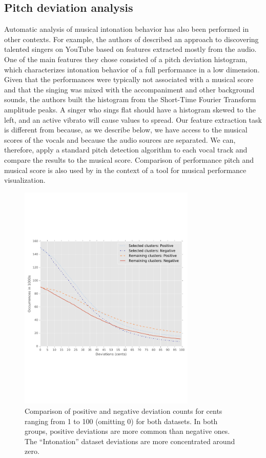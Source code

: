 \begin{appendices}
\subsection{Pitch deviation analysis}
Automatic analysis of musical intonation behavior has also been performed in other contexts. For example, the authors of \cite{nichols2012automatically} described an approach to discovering talented singers on YouTube based on features extracted mostly from the audio. One of the main features they chose consisted of a pitch deviation histogram, which characterizes intonation behavior of a full performance in a low dimension. Given that the performances were typically not associated with a musical score and that the singing was mixed with the accompaniment and other background sounds, the authors built the histogram from the Short-Time Fourier Transform amplitude peaks. A singer who sings flat should have a histogram skewed to the left, and an active vibrato will cause values to spread. Our feature extraction task is different from \cite{nichols2012automatically} because, as we describe below, we have access to the musical scores of the vocals and because the audio sources are separated. We can, therefore, apply a standard pitch detection algorithm to each vocal track and compare the results to the musical score. Comparison of performance pitch and musical score is also used by \cite{lim2010intune} in the context of a tool for musical performance visualization.


\begin{figure}[h!]
    \centering
    \includegraphics[width=0.75\textwidth]{figures/full_pos_vs_neg_line.pdf}\vspace{-1in}
    \caption{Comparison of positive and negative deviation counts for cents ranging from 1 to 100 (omitting 0) for both datasets. In both groups, positive deviations are more common than negative ones. The ``Intonation'' dataset deviations are more concentrated around zero. }
    \label{fig:pos_neg}
\end{figure}


\end{appendices}
